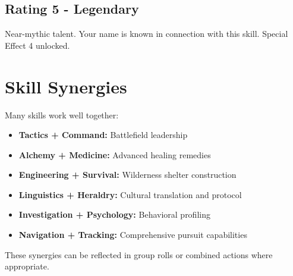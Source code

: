 \documentclass[11pt]{report}
\begin{document}
\subsection*{Rating 5 - Legendary}
Near-mythic talent. Your name is known in connection with this skill. Special Effect 4 unlocked.

\section*{Skill Synergies}

Many skills work well together:
\begin{itemize}
    \item \textbf{Tactics + Command:} Battlefield leadership
    \item \textbf{Alchemy + Medicine:} Advanced healing remedies
    \item \textbf{Engineering + Survival:} Wilderness shelter construction
    \item \textbf{Linguistics + Heraldry:} Cultural translation and protocol
    \item \textbf{Investigation + Psychology:} Behavioral profiling
    \item \textbf{Navigation + Tracking:} Comprehensive pursuit capabilities
\end{itemize}

These synergies can be reflected in group rolls or combined actions where appropriate.
\end{document}
